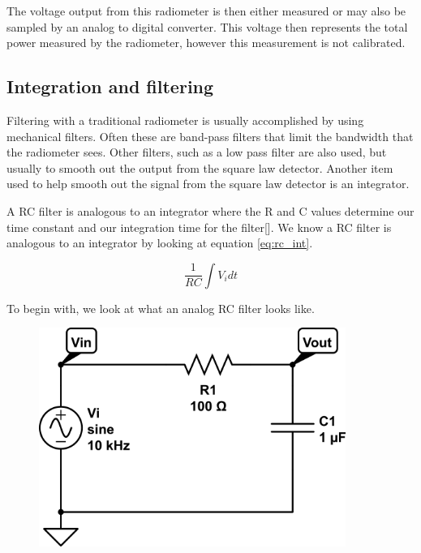 The voltage output from this radiometer is then either measured or may also be sampled by an analog to digital converter.  This voltage then represents the total power measured by the radiometer, however this measurement is not calibrated.


\subsection{Integration and filtering}

Filtering with a traditional radiometer is usually accomplished by using mechanical filters.  Often these are band-pass filters that limit the bandwidth that the radiometer sees.  Other filters, such as a low pass filter are also used, but usually to smooth out the output from the square law detector.  Another item used to help smooth out the signal from the square law detector is an integrator.

A RC filter is analogous to an integrator where the R and C values determine our time constant and our integration time for the filter[\cite{Aitken}].  We know a RC filter is analogous to an integrator by looking at equation \ref{eq:rc_int}.

\begin{equation}\label{eq:rc_int}
\frac{1}{RC}\int{V_idt}
\end{equation}

To begin with, we look at what an analog RC filter looks like. 

{\begin{figure}[h!tb] 
\centering
\includegraphics[width=10cm]{Images/rc-circuit.png}
\label{rc_circuit}
\end{figure}
}

